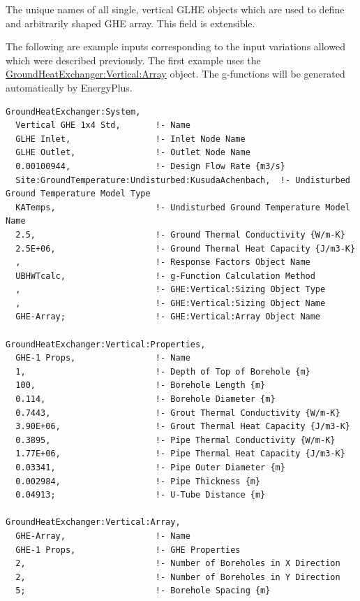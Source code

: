 The unique names of all single, vertical GLHE objects which are used to define and arbitrarily shaped GHE array.
This field is extensible.

The following are example inputs corresponding to the input variations allowed which were described previously.
The first example uses the \hyperref[groundheatexchangerverticalarray]{GroundHeatExchanger:Vertical:Array} object.
The g-functions will be generated automatically by EnergyPlus.

\begin{lstlisting}
GroundHeatExchanger:System,
  Vertical GHE 1x4 Std,       !- Name
  GLHE Inlet,                 !- Inlet Node Name
  GLHE Outlet,                !- Outlet Node Name
  0.00100944,                 !- Design Flow Rate {m3/s}
  Site:GroundTemperature:Undisturbed:KusudaAchenbach,  !- Undisturbed Ground Temperature Model Type
  KATemps,                    !- Undisturbed Ground Temperature Model Name
  2.5,                        !- Ground Thermal Conductivity {W/m-K}
  2.5E+06,                    !- Ground Thermal Heat Capacity {J/m3-K}
  ,                           !- Response Factors Object Name
  UBHWTcalc,                  !- g-Function Calculation Method
  ,                           !- GHE:Vertical:Sizing Object Type
  ,                           !- GHE:Vertical:Sizing Object Name
  GHE-Array;                  !- GHE:Vertical:Array Object Name

GroundHeatExchanger:Vertical:Properties,
  GHE-1 Props,                !- Name
  1,                          !- Depth of Top of Borehole {m}
  100,                        !- Borehole Length {m}
  0.114,                      !- Borehole Diameter {m}
  0.7443,                     !- Grout Thermal Conductivity {W/m-K}
  3.90E+06,                   !- Grout Thermal Heat Capacity {J/m3-K}
  0.3895,                     !- Pipe Thermal Conductivity {W/m-K}
  1.77E+06,                   !- Pipe Thermal Heat Capacity {J/m3-K}
  0.03341,                    !- Pipe Outer Diameter {m}
  0.002984,                   !- Pipe Thickness {m}
  0.04913;                    !- U-Tube Distance {m}

GroundHeatExchanger:Vertical:Array,
  GHE-Array,                  !- Name
  GHE-1 Props,                !- GHE Properties
  2,                          !- Number of Boreholes in X Direction
  2,                          !- Number of Boreholes in Y Direction
  5;                          !- Borehole Spacing {m}
\end{lstlisting}

